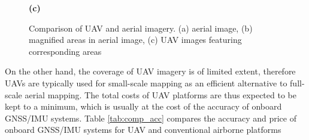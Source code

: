 \begin{figure}[ht]\centering
 \begin{subfigure}{0.99\columnwidth}
 \end{subfigure}

 \begin{subfigure}{0.244\columnwidth}
   \centering
{}
 \end{subfigure}
  \begin{subfigure}{0.244\columnwidth}
   \centering
{}
 \end{subfigure}
  \begin{subfigure}{0.244\columnwidth}
   \centering
{}
 \end{subfigure}
  \begin{subfigure}{0.244\columnwidth}
   \centering
{}
 \end{subfigure}
\vspace{1.1\baselineskip}
\centerline{\textbf{(c)}}
 \caption{Comparison of UAV and aerial imagery. (a) aerial image, (b) magnified areas in aerial image, (c) UAV images featuring corresponding areas}
\end{figure}
 
On the other hand, the coverage of UAV imagery is of limited extent, therefore UAVs are typically used for small-scale mapping as an efficient alternative to full-scale aerial mapping. The total costs of UAV platforms are thus expected to be kept to a minimum, which is usually at the cost of the accuracy of onboard GNSS/IMU systems. Table \ref{tab:comp_acc} compares the accuracy and price of onboard GNSS/IMU systems for UAV and conventional airborne platforms

